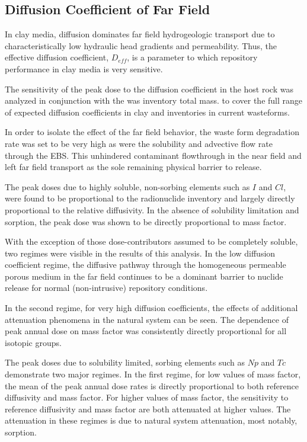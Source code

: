 
\subsection{Diffusion Coefficient of Far Field}
\label{sec:diffusivity}

In clay media, diffusion dominates far field hydrogeologic transport due to 
characteristically low hydraulic head gradients and permeability. Thus, the 
effective diffusion coefficient, $D_{eff}$, is a parameter to which repository 
performance in clay media is very sensitive. 

The sensitivity of the peak dose to the diffusion coefficient in the 
host rock was analyzed in conjunction with the was inventory total mass. 
to cover the full range of expected diffusion coefficients in clay and 
inventories in current wasteforms.

In order to isolate the effect of the far field behavior, the waste form 
degradation rate was set to be very high as were the solubility and advective 
flow rate through the  \gls{EBS}. This unhindered contaminant flowthrough 
in the near field and left far field transport as the sole remaining physical 
barrier to release.

The peak doses due to highly soluble, non-sorbing elements such as $I$ and $Cl$, 
were found to be proportional to the radionuclide inventory and 
largely directly proportional to the relative diffusivity. In the absence of 
solubility limitation and sorption, the peak dose was shown to be directly 
proportional to mass factor. 

With the exception of those dose-contributors assumed to be completely soluble, 
two regimes were visible in the results of this analysis. In the low diffusion 
coefficient regime, the diffusive pathway through the homogeneous permeable 
porous medium in the far field continues to be a  dominant barrier to nuclide 
release for normal (non-intrusive) repository conditions. 

In the second regime, for very high diffusion coefficients, the effects of 
additional attenuation phenomena in the natural system can be seen.  The 
dependence of peak annual dose on mass factor was consistently directly 
proportional for all isotopic groups.

The peak doses due to solubility limited, sorbing elements such as $Np$ and 
$Tc$ demonstrate two major regimes. In the first regime, for 
low values of mass factor, the mean of the peak annual dose rates is directly 
proportional to both reference diffusivity and mass factor.  For higher values 
of mass factor, the sensitivity to reference diffusivity and mass factor are 
both attenuated at higher values.  The attenuation in these regimes 
is due to natural system attenuation, most notably, sorption.

